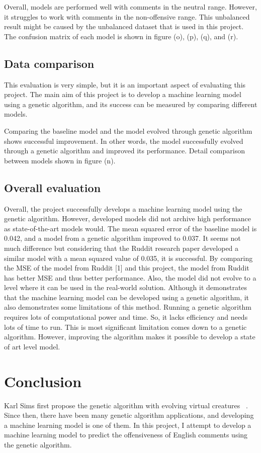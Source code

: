 \documentclass[11pt, natbib=false]{article}
\begin{document}
Overall, models are performed well with comments in the neutral range.
However, it struggles to work with comments in the non-offensive range.
This unbalanced result might be caused by the unbalanced dataset that is used in this project.
The confusion matrix of each model is shown in figure (o), (p), (q), and (r).

\subsection{Data comparison}
This evaluation is very simple, but it is an important aspect of evaluating this project.
The main aim of this project is to develop a machine learning model using a genetic algorithm, and its success can be measured by comparing different models.

Comparing the baseline model and the model evolved through genetic algorithm shows successful improvement.
In other words, the model successfully evolved through a genetic algorithm and improved its performance.
Detail comparison between models shown in figure (n).

\subsection{Overall evaluation}
Overall, the project successfully develops a machine learning model using the genetic algorithm.
However, developed models did not archive high performance as state-of-the-art models would.
The mean squared error of the baseline model is 0.042, and a model from a genetic algorithm improved to 0.037.
It seems not much difference but considering that the Ruddit research paper developed a similar model with a mean squared value of 0.035, it is successful.
By comparing the MSE of the model from Ruddit [1] and this project, the model from Ruddit has better MSE and thus better performance.
Also, the model did not evolve to a level where it can be used in the real-world solution.
Although it demonstrates that the machine learning model can be developed using a genetic algorithm, it also demonstrates some limitations of this method.
Running a genetic algorithm requires lots of computational power and time.
So, it lacks efficiency and needs lots of time to run.
This is most significant limitation comes down to a genetic algorithm.
However, improving the algorithm makes it possible to develop a state of art level model.

\section{Conclusion}
Karl Sims first propose the genetic algorithm with evolving virtual creatures ~\cite{sims1994evolving}.
Since then, there have been many genetic algorithm applications, and developing a machine learning model is one of them.
In this project, I attempt to develop a machine learning model to predict the offensiveness of English comments using the genetic algorithm.
\end{document}
